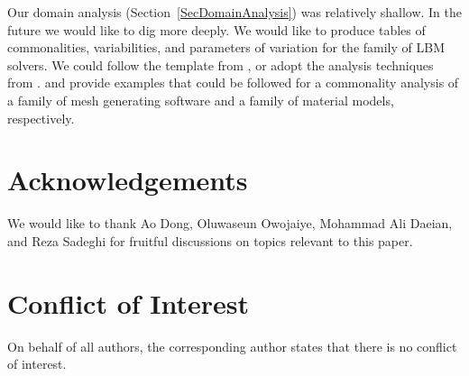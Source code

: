 \documentclass[final, 3p, times, authoryear]{elsarticle}
\begin{document}
Our domain analysis (Section~\ref{SecDomainAnalysis}) was relatively shallow.  In
the future we would like to dig more deeply.  We would like to produce tables of
commonalities, variabilities, and parameters of variation for the family of LBM
solvers. We could follow the template from \citet{smith2008commonality}, or
adopt the analysis techniques from \citet{weiss1998commonality}.
\citet{SmithAndChen2004} and \citet{SmithMcCutchanAndCarette2017} provide
examples that could be followed for a commonality analysis of a family of mesh
generating software and a family of material models, respectively.

\section*{Acknowledgements}

We would like to thank Ao Dong, Oluwaseun Owojaiye, Mohammad Ali Daeian, and Reza
Sadeghi for fruitful discussions on topics relevant to this paper.

\section*{Conflict of Interest}

On behalf of all authors, the corresponding author states that there is no
conflict of interest.



\end{document}
